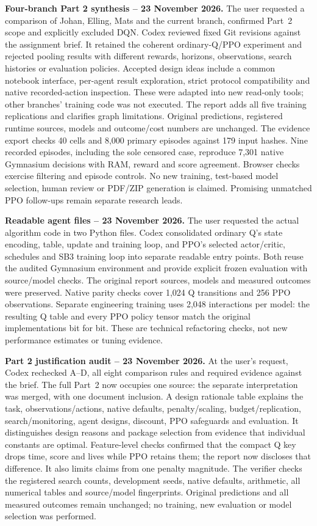 \medskip
\noindent\textbf{Four-branch Part 2 synthesis -- 23 November 2026.}
The user requested a comparison of Johan, Elling, Mats and the current branch,
confirmed Part~2 scope and explicitly excluded DQN. Codex reviewed fixed Git
revisions against the assignment brief. It retained the coherent ordinary-Q/PPO
experiment and rejected pooling results with different rewards, horizons,
observations, search histories or evaluation policies. Accepted design ideas
include a common notebook interface, per-agent result exploration, strict
protocol compatibility and native recorded-action inspection. These were
adapted into new read-only tools; other branches' training code was not executed.
The report adds all five training replications and clarifies graph limitations.
Original predictions, registered runtime sources, models and outcome/cost
numbers are unchanged. The evidence export checks 40 cells and 8,000 primary
episodes against 179 input hashes. Nine recorded episodes, including the sole
censored case, reproduce 7,301 native Gymnasium decisions with RAM, reward
and score agreement. Browser checks exercise filtering and episode controls.
No new training, test-based model selection, human review or PDF/ZIP generation
is claimed. Promising unmatched PPO follow-ups remain separate research leads.

\medskip
\noindent\textbf{Readable agent files -- 23 November 2026.}
The user requested the actual algorithm code in two Python files. Codex
consolidated ordinary Q's state encoding, table, update and training loop,
and PPO's selected actor/critic, schedules and SB3 training loop into separate
readable entry points. Both reuse the audited Gymnasium environment and
provide explicit frozen evaluation with source/model checks. The original
report sources, models and measured outcomes were preserved. Native parity
checks cover 1,024 Q transitions and 256 PPO observations. Separate engineering
training uses 2,048 interactions per model: the resulting Q table and every
PPO policy tensor match the original implementations bit for bit. These are
technical refactoring checks, not new performance estimates or tuning evidence.

\medskip
\noindent\textbf{Part 2 justification audit -- 23 November 2026.}
At the user's request, Codex rechecked A--D, all eight comparison rules and
required evidence against the brief. The full Part~2 now occupies one source:
the separate interpretation was merged, with one document inclusion. A design
rationale table explains the task, observations/actions, native defaults,
penalty/scaling, budget/replication, search/monitoring, agent designs, discount,
PPO safeguards and evaluation. It distinguishes design reasons and package
selection from evidence that individual constants are optimal. Feature-level
checks confirmed that the compact Q key drops time, score and lives while PPO
retains them; the report now discloses that difference. It also limits claims
from one penalty magnitude. The verifier checks the registered search counts,
development seeds, native defaults, arithmetic, all numerical tables and
source/model fingerprints. Original predictions and all measured outcomes
remain unchanged; no training, new evaluation or model selection was performed.

